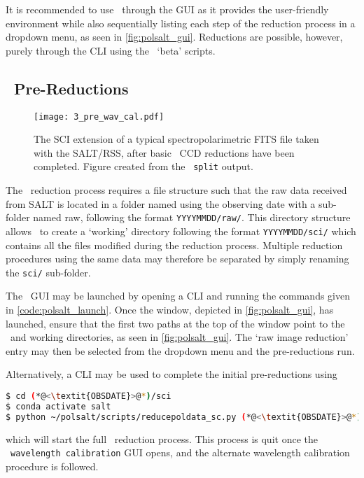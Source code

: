 It is recommended to use \polsalt\ through the \gls{GUI} as it provides the user-friendly environment while also sequentially listing each step of the reduction process in a dropdown menu, as seen in \autoref{fig:polsalt_gui}.
Reductions are possible, however, purely through the \gls{CLI} using the \polsalt\ `beta' scripts.

\subsection[\textsc{polsalt} Pre-Reductions]{\polsalt\ Pre-Reductions} \label{subsec:reduc_pre}

\begin{figure}[t]
    \centering
    \texttt{[image: 3\_pre\_wav\_cal.pdf]}
    \caption{The \gls{SCI} extension of a typical spectropolarimetric \acs{FITS} file taken with the \gls{SALT}/\gls{RSS}, after basic \polsalt\ \gls{CCD} reductions have been completed.
    Figure created from the \stops\ \texttt{split} output.}
    \label{fig:polsalt_pre_wav_cal}
\end{figure}

The \polsalt\ reduction process requires a file structure such that the raw data received from \gls{SALT} is located in a folder named using the observing date with a sub-folder named raw, following the format \texttt{YYYYMMDD/raw/}.
This directory structure allows \polsalt\ to create a `working' directory following the format \texttt{YYYYMMDD/sci/} which contains all the files modified during the reduction process.
Multiple reduction procedures using the same data may therefore be separated by simply renaming the \texttt{sci/} sub-folder.

The \polsalt\ \gls{GUI} may be launched by opening a \gls{CLI} and running the commands given in \autoref{code:polsalt_launch}.
Once the window, depicted in \autoref{fig:polsalt_gui}, has launched, ensure that the first two paths at the top of the window point to the \polsalt\ and working directories, as seen in \autoref{fig:polsalt_gui}.
The `raw image reduction' entry may then be selected from the dropdown menu and the pre-reductions run.

Alternatively, %
a \gls{CLI} may be used to complete the initial pre-reductions using
\begin{lstlisting}[language=bash]
$ cd (*@<\textit{OBSDATE}>@*)/sci
$ conda activate salt
$ python ~/polsalt/scripts/reducepoldata_sc.py (*@<\textit{OBSDATE}>@*)
\end{lstlisting}
{\parskip=0pt which} will start the full \polsalt\ reduction process.
This process is quit once the \polsalt\ \texttt{wavelength calibration} \gls{GUI} opens, and the alternate wavelength calibration procedure is followed.

